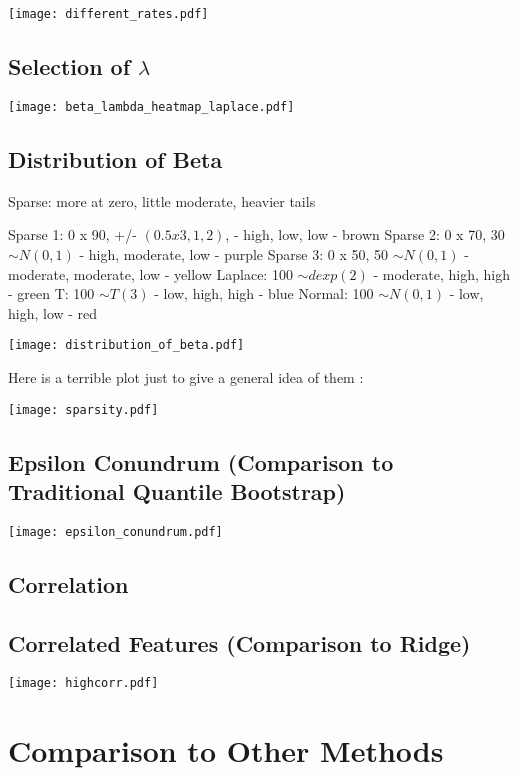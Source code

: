 \texttt{[image: different\_rates.pdf]}

\subsection{Selection of \texorpdfstring{$\lambda$}{lambda}}

\texttt{[image: beta\_lambda\_heatmap\_laplace.pdf]}

\subsection{Distribution of Beta}

Sparse: more at zero, little moderate, heavier tails

Sparse 1: 0 x 90, +/- $(0.5 x 3, 1, 2)$,
- high, low, low  - brown
Sparse 2: 0 x 70, 30 $\sim N(0, 1)$
- high, moderate, low - purple
Sparse 3: 0 x 50, 50 $\sim N(0, 1)$
- moderate, moderate, low - yellow
Laplace: 100 $\sim dexp(2)$
- moderate, high, high - green
T: 100 $\sim T(3)$
- low, high, high - blue
Normal: 100 $\sim N(0, 1)$
- low, high, low - red

\texttt{[image: distribution\_of\_beta.pdf]}

Here is a terrible plot just to give a general idea of them :

\texttt{[image: sparsity.pdf]}

\subsection{Epsilon Conundrum (Comparison to Traditional Quantile Bootstrap)}

\texttt{[image: epsilon\_conundrum.pdf]}

\subsection{Correlation}

\subsection{Correlated Features (Comparison to Ridge)}

\texttt{[image: highcorr.pdf]}

\section{Comparison to Other Methods}

